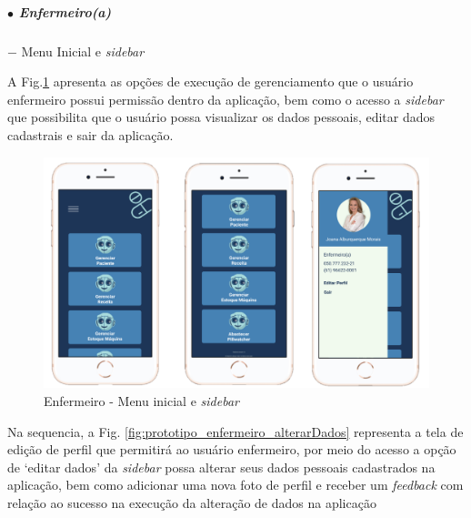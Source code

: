 
\subparagraph*{$\bullet$ Enfermeiro(a)} \hfill
\subparagraph*{} $-$ Menu Inicial e \textit{sidebar}

A Fig.\ref{fig:prototipo_enfermeiro_menuInicial_e_Sidebar} apresenta as opções de execução de gerenciamento que o usuário enfermeiro possui permissão dentro da aplicação, bem como o acesso a \textit{sidebar} que possibilita que o usuário possa visualizar os dados pessoais, editar dados cadastrais e sair da aplicação.

\begin{figure}[H]
    \centering
    \includegraphics[width=15cm]{figuras/software/Atual_prototipo/Enfermeiro_TelaInicial_e_Sidebar.png}
    \caption{Enfermeiro - Menu inicial e \textit{sidebar}}
    \label{fig:prototipo_enfermeiro_menuInicial_e_Sidebar}
\end{figure}

Na sequencia, a Fig. \ref{fig:prototipo_enfermeiro_alterarDados} representa a tela de edição de perfil que permitirá ao usuário enfermeiro, por meio do acesso a opção de `editar dados' da \emph{sidebar} possa alterar seus dados pessoais cadastrados na aplicação, bem como adicionar uma nova foto de perfil e receber um \textit{feedback} com relação ao sucesso na execução da alteração de dados na aplicação

